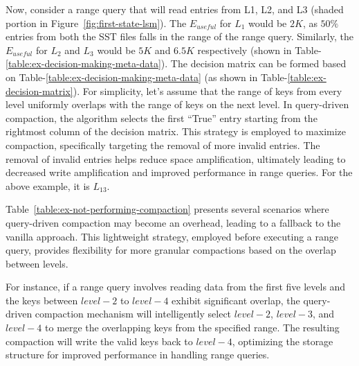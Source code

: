 Now, consider a range query that will read entries from L1, L2, and L3 (shaded portion in Figure~\ref{fig:first-state-lsm}).
The $E_{useful}$ for $L_1$ would be $2K$, as $50\%$ entries from both the SST files falls in the range of the range query.
Similarly, the $E_{useful}$ for $L_2$ and $L_3$ would be $5K$ and $6.5K$ respectively (shown in Table-\ref{table:ex-decision-making-meta-data}). 
The decision matrix can be formed based on Table-\ref{table:ex-decision-making-meta-data} (as shown in 
Table-\ref{table:ex-decision-matrix}). For simplicity, let's assume that the range of keys from every level uniformly 
overlaps with the range of keys on the next level. In query-driven compaction, the algorithm selects the first ``True''
entry starting from the rightmost column of the decision matrix. This strategy is employed to maximize compaction, 
specifically targeting the removal of more invalid entries. The removal of invalid entries helps reduce space 
amplification, ultimately leading to decreased write amplification and improved performance in range queries.
For the above example, it is $L_{13}$.

Table~\ref{table:ex-not-performing-compaction} presents several scenarios where query-driven compaction may become an 
overhead, leading to a fallback to the vanilla approach. This lightweight strategy, employed before executing a range 
query, provides flexibility for more granular compactions based on the overlap between levels.

For instance, if a range query involves reading data from the first five levels and the keys between $level-2$ to 
$level-4$ exhibit significant overlap, the query-driven compaction mechanism will intelligently select $level-2$, 
$level-3$, and $level-4$ to merge the overlapping keys from the specified range. The resulting compaction will write 
the valid keys back to $level-4$, optimizing the storage structure for improved performance in handling range queries.

